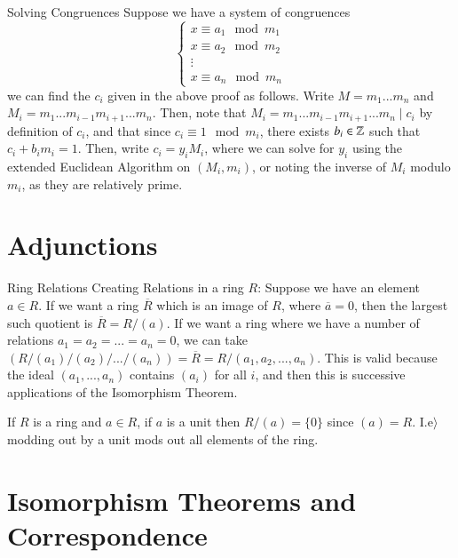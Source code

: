 \documentclass[12pt, a4paper, twoside, openright, titlepage]{book}
\begin{document}
\begin{rmk}{Solving Congruences}{}
    Suppose we have a system of congruences \begin{equation}
        \left\{\begin{array}{l}
            x \equiv a_1 \mod m_1 \\
            x \equiv a_2 \mod m_2 \\
            \vdots \\
            x \equiv a_n \mod m_n 
            \end{array}\right.
    \end{equation}
    we can find the $c_i$ given in the above proof as follows. Write $M = m_1...m_n$ and \\$M_i = m_1...m_{i-1}m_{i+1}...m_n$. Then, note that $M_i = m_1...m_{i-1}m_{i+1}...m_n\;\vert\;c_i$ by definition of $c_i$, and that since $c_i \equiv 1 \mod m_i$, there exists $b_i \in \mathbb Z$ such that $c_i + b_im_i = 1$. Then, write $c_i = y_iM_i$, where we can solve for $y_i$ using the extended Euclidean Algorithm on $(M_i, m_i)$, or noting the inverse of $M_i$ modulo $m_i$, as they are relatively prime. 
\end{rmk}


\section{\textsection Adjunctions}

\begin{defn}{Ring Relations}{}
        Creating Relations in a ring $R$: Suppose we have an element $a \in R$. If we want a ring $\overline{R}$ which is an image of $R$, where $\overline{a} = 0$, then the largest such quotient is $\overline{R} = R/(a)$. If we want a ring where we have a number of relations $a_1=a_2=...=a_n=0$, we can take $(R/(a_1)/(a_2)/.../(a_n))=\overline{R}=R/(a_1,a_2,...,a_n)$. This is valid because the ideal $(a_1,...,a_n)$ contains $(a_i)$ for all $i$, and then this is successive applications of the Isomorphism Theorem.
\end{defn}

\begin{rmk}{}{}
        If $R$ is a ring and $a \in R$, if $a$ is a unit then $R/(a) = \{0\}$ since $(a) = R$. I.e$\rangle$ modding out by a unit mods out all elements of the ring.
\end{rmk}


\section{\textsection Isomorphism Theorems and Correspondence}
\end{document}
